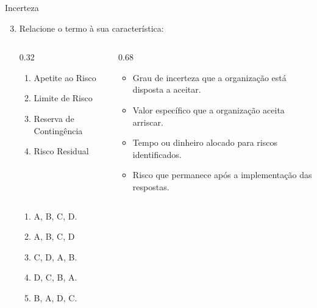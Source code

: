 \documentclass{beamer}
\begin{document}
\begin{frame}{Incerteza}
	\begin{enumerate}
		\setcounter{enumi}{2}
		\justifying
		\item Relacione o termo à sua característica:
		\begin{columns}
			\begin{column}{0.32\textwidth}
				\begin{enumerate}[A]
					\item Apetite ao Risco
					\item Limite de Risco
					\item Reserva de Contingência
					\item Risco Residual
				\end{enumerate}
			\end{column}
			\begin{column}{0.68\textwidth}
				\begin{itemize}
					\item Grau de incerteza que a organização está disposta a aceitar.
					\item Valor específico que a organização aceita arriscar.
					\item Tempo ou dinheiro alocado para riscos identificados.
					\item Risco que permanece após a implementação das respostas.
				\end{itemize}
			\end{column}
		\end{columns}
		\begin{enumerate}[a]
			\item A, B, C, D.
			\item \alert<2>{A, B, C, D}
			\item C, D, A, B.
			\item D, C, B, A.
			\item B, A, D, C.
		\end{enumerate}
	\end{enumerate}
\end{frame}
\end{document}
